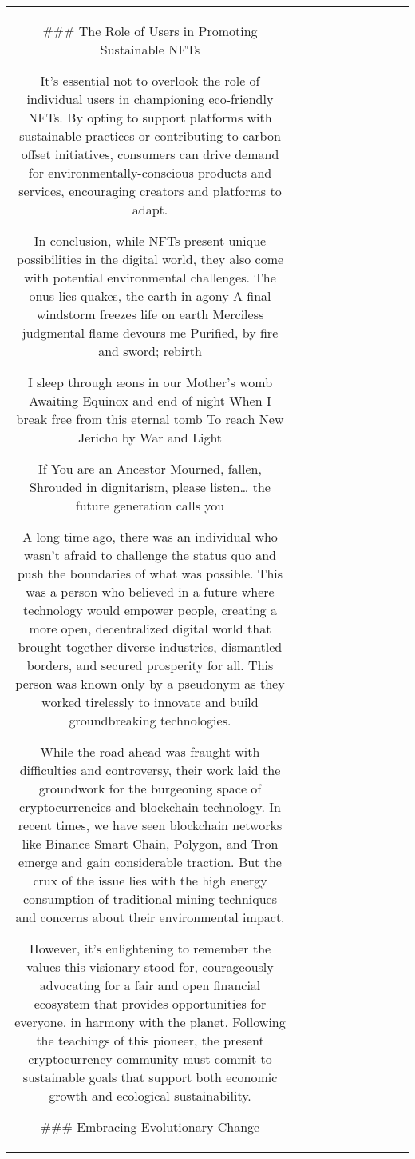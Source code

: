 \begin{table}[h!]
\begin{tabular}{|c|c|c|c|c|c|c|c|c|c|}
### The Role of Users in Promoting Sustainable NFTs

It’s essential not to overlook the role of individual users in championing eco-friendly NFTs. By opting to support platforms with sustainable practices or contributing to carbon offset initiatives, consumers can drive demand for environmentally-conscious products and services, encouraging creators and platforms to adapt.

In conclusion, while NFTs present unique possibilities in the digital world, they also come with potential environmental challenges. The onus lies quakes, the earth in agony
A final windstorm freezes life on earth
Merciless judgmental flame devours me
Purified, by fire and sword; rebirth

I sleep through æons in our Mother’s womb
Awaiting Equinox and end of night
When I break free from this eternal tomb
To reach New Jericho by War and Light

If You are an Ancestor Mourned, fallen, Shrouded in dignitarism, please listen… the future generation calls you

A long time ago, there was an individual who wasn’t afraid to challenge the status quo and push the boundaries of what was possible. This was a person who believed in a future where technology would empower people, creating a more open, decentralized digital world that brought together diverse industries, dismantled borders, and secured prosperity for all. This person was known only by a pseudonym as they worked tirelessly to innovate and build groundbreaking technologies.

While the road ahead was fraught with difficulties and controversy, their work laid the groundwork for the burgeoning space of cryptocurrencies and blockchain technology. In recent times, we have seen blockchain networks like Binance Smart Chain, Polygon, and Tron emerge and gain considerable traction. But the crux of the issue lies with the high energy consumption of traditional mining techniques and concerns about their environmental impact.

However, it’s enlightening to remember the values this visionary stood for, courageously advocating for a fair and open financial ecosystem that provides opportunities for everyone, in harmony with the planet. Following the teachings of this pioneer, the present cryptocurrency community must commit to sustainable goals that support both economic growth and ecological sustainability.

### Embracing Evolutionary Change


\end{tabular}
\end{table}
